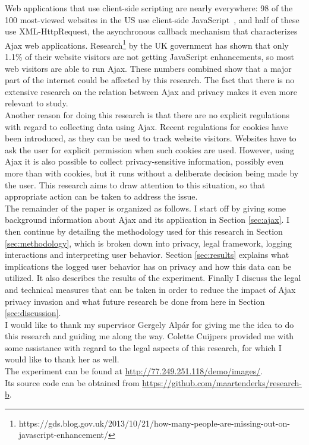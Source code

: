 Web applications that use client-side scripting are nearly everywhere: 98 of the 100 most-viewed websites in the US use client-side JavaScript~\cite{guha2009using}, and half of these use XML-HttpRequest, the asynchronous callback mechanism that characterizes Ajax web applications. Research\footnote{https://gds.blog.gov.uk/2013/10/21/how-many-people-are-missing-out-on-javascript-enhancement/} by the UK government has shown that only 1.1\% of their website visitors are not getting JavaScript enhancements, so most web visitors are able to run Ajax. These numbers combined show that a major part of the internet could be affected by this research. The fact that there is no extensive research on the relation between Ajax and privacy makes it even more relevant to study.\\

Another reason for doing this research is that there are no explicit regulations with regard to collecting data using Ajax. Recent regulations for cookies have been introduced, as they can be used to track website visitors. Websites have to ask the user for explicit permission when such cookies are used. However, using Ajax it is also possible to collect privacy-sensitive information, possibly even more than with cookies, but it runs without a deliberate decision being made by the user. This research aims to draw attention to this situation, so that appropriate action can be taken to address the issue.\\
	
The remainder of the paper is organized as follows. I start off by giving some background information about Ajax and its application in Section \ref{sec:ajax}. I then continue by detailing the methodology used for this research in Section \ref{sec:methodology}, which is broken down into privacy, legal framework, logging interactions and interpreting user behavior. Section \ref{sec:results} explains what implications the logged user behavior has on privacy and how this data can be utilized. It also describes the results of the experiment. Finally I discuss the legal and technical measures that can be taken in order to reduce the impact of Ajax privacy invasion and what future research be done from here in Section \ref{sec:discussion}.\\

I would like to thank my supervisor Gergely Alp\'{a}r for giving me the idea to do this research and guiding me along the way. Colette Cuijpers provided me with some assistance with regard to the legal aspects of this research, for which I would like to thank her as well.\\

The experiment can be found at \url{http://77.249.251.118/demo/images/}.\\ Its source code can be obtained from \url{https://github.com/maartenderks/research-b}.